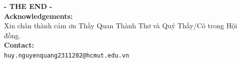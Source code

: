 \documentclass[aspectratio=169,9pt]{beamer}
\begin{document}
{
\begin{frame}[plain]
  \vspace{1.0cm}
  \begin{center}
    {\Huge\textbf{\color{bkblue}- THE END -}}\\[0.8cm]

    \textbf{\color{black}Acknowledgements:}\\
    \small Xin chân thành cảm ơn Thầy Quan Thành Thơ và Quý Thầy/Cô trong Hội đồng.\\[1.2cm]

    \textbf{\color{black}Contact:}\\
    \texttt{\color{bkblue}huy.nguyenquang2311202@hcmut.edu.vn}
  \end{center}
\end{frame}
}
\end{document}
